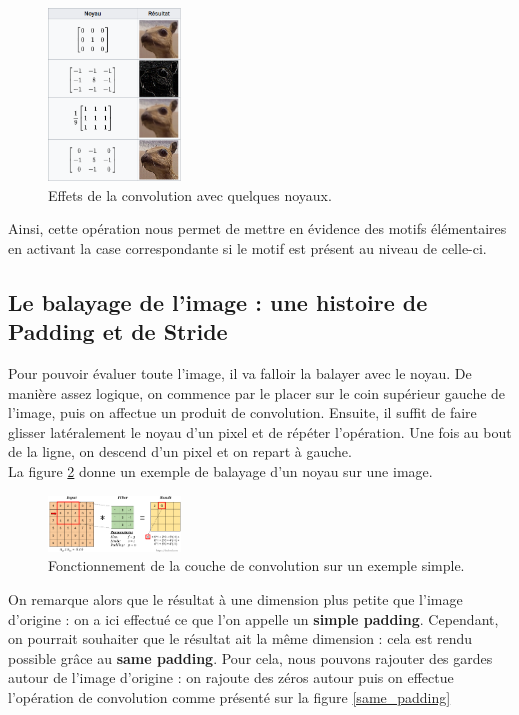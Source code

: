 \begin{figure}[!h]
\centering
\includegraphics[width=100pt]{images/cnn/chien_prairie.png} 
\caption{Effets de la convolution avec quelques noyaux.}
\label{chien_prairie}
\end{figure}

Ainsi, cette opération nous permet de mettre en évidence des motifs élémentaires en activant la case correspondante si le motif est présent au niveau de celle-ci.

\subsection{Le balayage de l'image : une histoire de Padding et de Stride}

Pour pouvoir évaluer toute l'image, il va falloir la balayer avec le noyau. De manière assez logique, on commence par le placer sur le coin supérieur gauche de l'image, puis on affectue un produit de convolution. Ensuite, il suffit de faire glisser latéralement le noyau d'un pixel et de répéter l'opération. Une fois au bout de la ligne, on descend d'un pixel et on repart à gauche. \\
La figure \ref{convolution} donne un exemple de balayage d'un noyau sur une image.

\begin{figure}[!h]
\centering
\includegraphics[width=100pt]{images/cnn/convolution.png}
\caption{Fonctionnement de la couche de convolution sur un exemple simple.}
\label{convolution}
\end{figure}

On remarque alors que le résultat à une dimension plus petite que l'image d'origine : on a ici effectué ce que l'on appelle un \textbf{simple padding}. Cependant, on pourrait souhaiter que le résultat ait la même dimension : cela est rendu possible grâce au \textbf{same padding}. Pour cela, nous pouvons rajouter des gardes autour de l'image d'origine : on rajoute des zéros autour puis on effectue l'opération de convolution comme présenté sur la figure \ref{same_padding}

